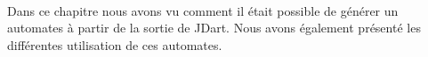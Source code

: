 \paragraph{}
Dans ce chapitre nous avons vu comment il était possible de générer un 
automates à partir de la sortie de JDart. Nous avons également présenté les 
différentes utilisation de ces automates. 


